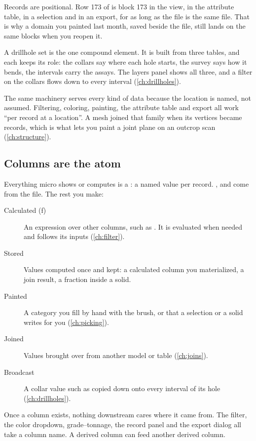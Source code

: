 Records are positional. Row 173 of  is block 173 in the view, in the attribute table, in a selection and in an export, for as long as the file is the same file. That is why a domain you painted last month, saved beside the file, still lands on the same blocks when you reopen it.

A drillhole set is the one compound element. It is built from three tables, and each keeps its role: the collars say where each hole starts, the survey says how it bends, the intervals carry the assays. The layers panel shows all three, and a filter on the collars flows down to every interval (\cref{ch:drillholes}).

\begin{why}
The same machinery serves every kind of data because the location is named, not assumed. Filtering, coloring, painting, the attribute table and export all work ``per record at a location''. A mesh joined that family when its vertices became records, which is what lets you paint a joint plane on an outcrop scan (\cref{ch:structure}).
\end{why}

\subsection{Columns are the atom}\label{sec:micro-columns}
Everything micro shows or computes is a : a named value per record. ,  and  come from the file. The rest you make:

\begin{description}
\item[Calculated (ƒ)] An expression over other columns, such as . It is evaluated when needed and follows its inputs (\cref{ch:filter}).
\item[Stored] Values computed once and kept: a calculated column you materialized, a join result, a fraction inside a solid.
\item[Painted] A category you fill by hand with the brush, or that a selection or a solid writes for you (\cref{ch:picking}).
\item[Joined] Values brought over from another model or table (\cref{ch:joins}).
\item[Broadcast] A collar value such as  copied down onto every interval of its hole (\cref{ch:drillholes}).
\end{description}

Once a column exists, nothing downstream cares where it came from. The filter, the color dropdown, grade–tonnage, the record panel and the export dialog all take a column name. A derived column can feed another derived column.

